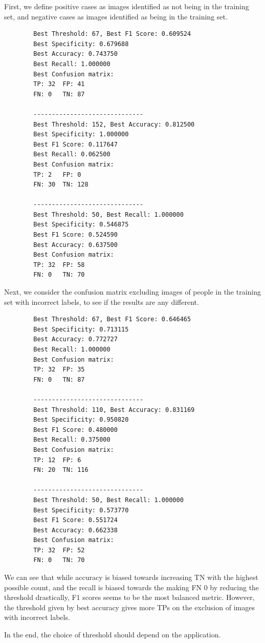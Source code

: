 \documentclass{article}
\begin{document}
\newpage
First, we define positive cases as images identified as not being in the training set, and negative cases as images identified as being in the training set.
\begin{tcolorbox}[title={Normal Confusion Matrix}]
    \begin{lstlisting}
        Best Threshold: 67, Best F1 Score: 0.609524
        Best Specificity: 0.679688
        Best Accuracy: 0.743750
        Best Recall: 1.000000
        Best Confusion matrix:
        TP: 32  FP: 41
        FN: 0   TN: 87

        ------------------------------
        Best Threshold: 152, Best Accuracy: 0.812500
        Best Specificity: 1.000000
        Best F1 Score: 0.117647
        Best Recall: 0.062500
        Best Confusion matrix:
        TP: 2   FP: 0
        FN: 30  TN: 128

        ------------------------------
        Best Threshold: 50, Best Recall: 1.000000
        Best Specificity: 0.546875
        Best F1 Score: 0.524590
        Best Accuracy: 0.637500
        Best Confusion matrix:
        TP: 32  FP: 58
        FN: 0   TN: 70
    \end{lstlisting}
\end{tcolorbox}
\newpage
Next, we consider the confusion matrix excluding images of people in the training set with incorrect labels, to see if the results are any different.
\begin{tcolorbox}[title={Confusion Matrix (excluding images with incorrect labels)}]
    \begin{lstlisting}
        Best Threshold: 67, Best F1 Score: 0.646465
        Best Specificity: 0.713115
        Best Accuracy: 0.772727
        Best Recall: 1.000000
        Best Confusion matrix:
        TP: 32  FP: 35
        FN: 0   TN: 87

        ------------------------------
        Best Threshold: 110, Best Accuracy: 0.831169
        Best Specificity: 0.950820
        Best F1 Score: 0.480000
        Best Recall: 0.375000
        Best Confusion matrix:
        TP: 12  FP: 6
        FN: 20  TN: 116

        ------------------------------
        Best Threshold: 50, Best Recall: 1.000000
        Best Specificity: 0.573770
        Best F1 Score: 0.551724
        Best Accuracy: 0.662338
        Best Confusion matrix:
        TP: 32  FP: 52
        FN: 0   TN: 70
    \end{lstlisting}
\end{tcolorbox}

We can see that while accuracy is biased towards increasing TN with the highest possible count, and the recall is biased towards the making FN 0 by reducing the threshold drastically, F1 scores seems to be the most balanced metric. However, the threshold given by best accuracy gives more TPs on the exclusion of images with incorrect labels.
\vspace{5pt}

In the end, the choice of threshold should depend on the application.
\end{document}
